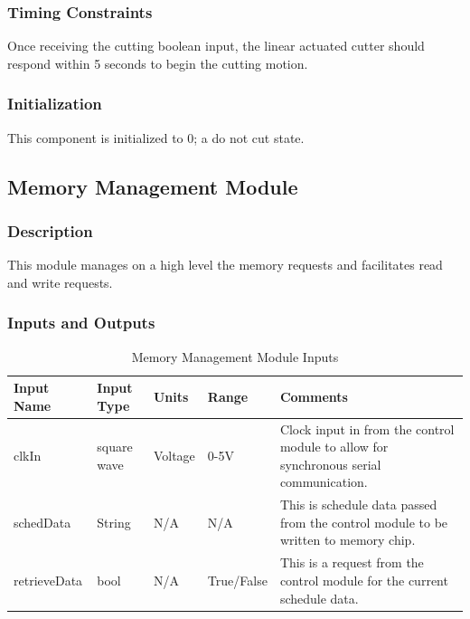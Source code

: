 \documentclass[12pt,titlepage]{article}
\begin{document}
\subsubsection*{Timing Constraints}
Once receiving the cutting boolean input, the linear actuated cutter should respond within 5 seconds to begin the cutting motion.
\subsubsection*{Initialization}
This component is initialized to 0; a do not cut state.

\subsection{Memory Management Module }
\subsubsection*{Description}
This module manages on a high level the memory requests and facilitates read and write requests. 
\subsubsection*{Inputs and Outputs}

\begin{table}[ht!]
\begin{center}
\begin{adjustbox}{max width=\textwidth}
\small
\begin{tabular}{|p{}|p{}|p{}|p{}|p{}|}
 \hline
 \textbf{Input Name} & \textbf{Input Type} & \textbf{Units} &\textbf{Range} & \textbf{Comments} \\
 \hline 
   clkIn & square wave  & Voltage & 0-5V & Clock input in from the control module to allow for synchronous serial communication.  \\
 \hline
schedData & String  & N/A & N/A & This is schedule data passed from the control module to be written to memory chip.  \\
 \hline
 retrieveData & bool & N/A & True/False & This is a request from the control module for the current schedule data.  \\
 \hline
\end{tabular}
\end{adjustbox}
\end{center}
\caption{Memory Management Module Inputs}
\end{table}
\end{document}
